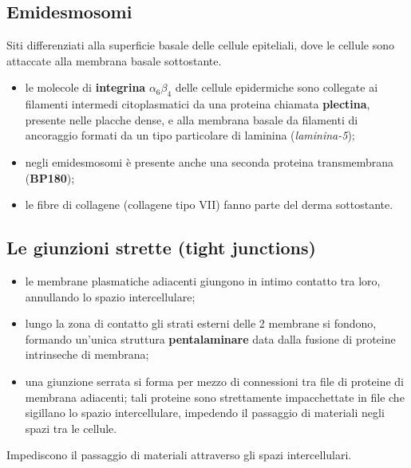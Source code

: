 \subsection{Emidesmosomi}

Siti differenziati alla superficie basale delle cellule epiteliali, dove le cellule sono attaccate alla membrana basale sottostante.

\begin{itemize}
  \item le molecole di \textbf{integrina} $\alpha_6\beta_4$ delle cellule epidermiche sono collegate ai filamenti intermedi citoplasmatici da una proteina chiamata \textbf{plectina}, presente nelle placche dense, e alla membrana basale da filamenti di ancoraggio formati da un tipo particolare di laminina (\textit{laminina-5});
  \item negli emidesmosomi è presente anche una seconda proteina transmembrana (\textbf{BP180});
  \item le fibre di collagene (collagene tipo VII) fanno parte del derma sottostante.
\end{itemize}

\subsection{Le giunzioni strette (tight junctions)}

\begin{itemize}
  \item le membrane plasmatiche adiacenti giungono in intimo contatto tra loro, annullando lo spazio intercellulare;
  \item lungo la zona di contatto gli strati esterni delle 2 membrane si fondono, formando un'unica struttura \textbf{pentalaminare} data dalla fusione di proteine intrinseche di membrana;
  \item una giunzione serrata si forma per mezzo di connessioni tra file di proteine di membrana adiacenti; tali proteine sono strettamente impacchettate in file che sigillano lo spazio intercellulare, impedendo il passaggio di materiali negli spazi tra le cellule.
\end{itemize}

Impediscono il passaggio di materiali attraverso gli spazi intercellulari.

